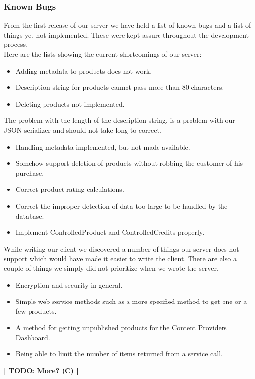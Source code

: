 \subsubsection{Known Bugs}
From the first release of our server we have held a list of known bugs and a list of things yet not implemented. These were kept assure throughout the development process.
\\Here are the lists showing the current shortcomings of our server:
\begin{itemize}
\item Adding metadata to products does not work.
\item Description string for products cannot pass more than 80 characters.
\item Deleting products not implemented.
\end{itemize}
The problem with the length of the description string, is a problem with our JSON serializer and should not take long to correct.
\begin{itemize}
\item Handling metadata implemented, but not made available.
\item Somehow support deletion of products without robbing the customer of his purchase.
\item Correct product rating calculations.
\item Correct the improper detection of data too large to be handled by the database.
\item Implement ControlledProduct and ControlledCredits properly.
\end{itemize}
While writing our client we discovered a number of things our server does not support which would have made it easier to write the client. There are also a couple of things we simply did not prioritize when we wrote the server.
\begin{itemize}
\item Encryption and security in general.
\item Simple web service methods such as a more specified method to get one or a few products.
\item A method for getting unpublished products for the Content Providers Dashboard.
\item Being able to limit the number of items returned from a service call.
\end{itemize}
\textbf{[ TODO: More? (C) ]}